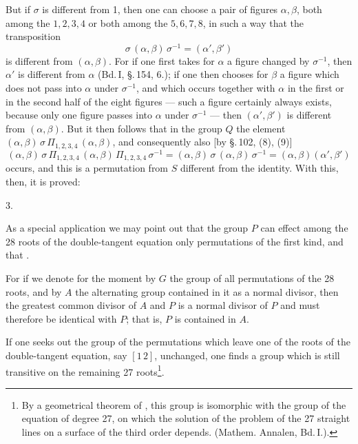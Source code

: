 
But if $\sigma$ is different from 1, then one can choose a pair of figures $\alpha, \beta$, both among the $1,2,3,4$ or both among the $5,6,7,8$, in such a way that the transposition
\[
\sigma\,(\alpha,\beta)\,\sigma^{-1} = (\alpha', \beta')
\]
is different from $(\alpha, \beta)$. For if one first takes for $\alpha$ a figure changed by $\sigma^{-1}$, then $\alpha'$ is different from $\alpha$ (Bd.\,I, \S.\,154, 6.); if one then chooses for $\beta$ a figure which does not pass into $\alpha$ under $\sigma^{-1}$, and which occurs together with $\alpha$ in the first or in the second half of the eight figures — such a figure certainly always exists, because only one figure passes into $\alpha$ under $\sigma^{-1}$ — then $(\alpha', \beta')$ is different from $(\alpha, \beta)$. But it then follows that in the group $Q$ the element $(\alpha,\beta)\,\sigma\,\Pi_{1,2,3,4}\,(\alpha,\beta)$, and consequently also [by \S.\,102, (8), (9)]
\[
(\alpha,\beta)\,\sigma\,\Pi_{1,2,3,4}\,(\alpha,\beta)\,\Pi_{1,2,3,4}\,\sigma^{-1} = (\alpha,\beta)\,\sigma\,(\alpha,\beta)\,\sigma^{-1} = (\alpha,\beta)(\alpha',\beta')
\]
occurs, and this is a permutation from $S$ different from the identity. With this, then, it is proved:

3.\ 

As a special application we may point out that the group $P$ can effect among the 28 roots of the double-tangent equation only permutations of the first kind, and that .

For if we denote for the moment by $G$ the group of all permutations of the 28 roots, and by $A$ the alternating group contained in it as a normal divisor, then the greatest common divisor of $A$ and $P$ is a normal divisor of $P$ and must therefore be identical with $P$; that is, $P$ is contained in $A$.

If one seeks out the group of the permutations which leave one of the roots of the double-tangent equation, say $[1\,2]$, unchanged, one finds a group which is still transitive on the remaining 27 roots\footnote{By a geometrical theorem of , this group is isomorphic with the group of the equation of degree 27, on which the solution of the problem of the 27 straight lines on a surface of the third order depends. (Mathem. Annalen, Bd.\,I.).}.
